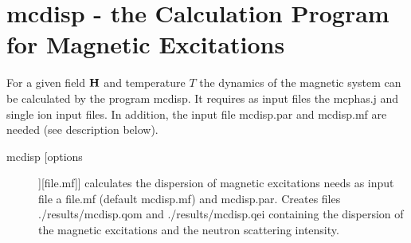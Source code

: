 
\section{{\prg mcdisp} - the Calculation Program for Magnetic Excitations}\label{mcdisp}

For a given field $\mathbf H$ and temperature $T$ the dynamics of the magnetic system
can be calculated by the program {\prg mcdisp}. It requires as input files
the {\prg mcphas.j} and single ion input files. In addition, the input file
{\prg mcdisp.par} and {\prg mcdisp.mf} are needed (see description below).

\begin{description}
\item [\prg mcdisp [options]][file.mf]]  
      calculates the dispersion of magnetic excitations
	  needs as input file a {\prg file.mf} (default {\prg mcdisp.mf})
				and {\prg mcdisp.par}.  Creates  
				files {\prg ./results/mcdisp.qom} and {\prg ./results/mcdisp.qei}
				containing the dispersion of the magnetic excitations and the neutron
				scattering intensity. 
				

\end{description}
